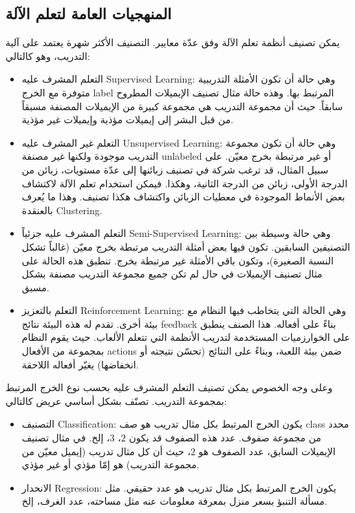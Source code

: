 \subsection{المنهجيات العامة لتعلم الآلة}
\label{sec:ml:classification}
يمكن تصنيف أنظمة تعلم الآلة وفق عدّة معايير. التصنيف الأكثر شهرة يعتمد على آلية التدريب، وهو كالتالي:
\begin{itemize}
	\item
	التعلم المشرف عليه \textenglish{Supervised Learning}:
	وهي حالة أن تكون الأمثلة التدريبية متوفرة مع الخرج \textenglish{label} المرتبط بها. وهذه حالة مثال تصنيف الإيميلات المطروح سابقاً.
	حيث أن مجموعة التدريب هي مجموعة كبيرة من الإيميلات المصنفة مسبقاً من قبل البشر إلى إيميلات مؤذية وإيميلات غير مؤذية.
	\item
	التعلم غير المشرف عليه \textenglish{Unsupervised Learning}:
	وهي حالة أن تكون مجموعة التدريب موجودة ولكنها غير مصنفة \textenglish{unlabeled} أو غير مرتبطة بخرج معيّن.
	على سبيل المثال، قد ترغب شركة في تصنيف زبائنها إلى عدّة مستويات، زبائن من الدرجة الأولى، زبائن من الدرجة الثانية، وهكذا.
	فيمكن استخدام تعلم الآلة لاكتشاف بعض الأنماط الموجودة في معطيات الزبائن واكتشاف هكذا تصنيف.
	وهذا ما يُعرف بالعنقدة \textenglish{Clustering}.
	\item
	التعلم المشرف عليه جزئياً \textenglish{Semi-Supervised Learning}:
	وهي حالة وسيطة بين التصنيفين السابقين. تكون فيها بعض أمثلة التدريب مرتبطة بخرج معيّن (غالباً تشكل النسبة الصغيرة)،
	وتكون باقي الأمثلة غير مرتبطة بخرج. تنطبق هذه الحالة على مثال تصنيف الإيميلات في حال لم تكن جميع مجموعة التدريب مصنفة بشكل مسبق.
	\item 
	التعلم بالتعزيز \textenglish{Reinforcement Learning}:
	وهي الحالة التي يتخاطب فيها النظام مع بيئة أخرى. تقدم له هذه البيئة نتائج \textenglish{feedback} بناءً على أفعاله.
	هذا الصنف ينطبق على الخوارزميات المستخدمة لتدريب الأنظمة التي تتعلم الألعاب.
	حيث يقوم النظام بمجموعة من الأفعال \textenglish{actions} ضمن بيئة اللعبة،
	وبناءً على النتائج (تحسّن نتيجته أو انخفاضها) يغيّر أفعاله اللاحقة.
\end{itemize}

وعلى وجه الخصوص يمكن تصنيف التعلم المشرف عليه بحسب نوع الخرج المرتبط بمجموعة التدريب.
تصنّف بشكل أساسي عريض كالتالي:
\begin{itemize}
	\item 
	التصنيف \textenglish{Classification}:
	يكون الخرج المرتبط بكل مثال تدريب هو صف \textenglish{class} محدد من مجموعة صفوف. عدد هذه الصفوف قد يكون $2$، $3$، إلخ.
	في مثال تصنيف الإيميلات السابق، عدد الصفوف هو $2$، حيث أن كل مثال تدريب (إيميل معيّن من مجموعة التدريب) هو إمّا مؤذي أو غير مؤذي.
	\item 
	الانحدار \textenglish{Regression}:
	يكون الخرج المرتبط بكل مثال تدريب هو عدد حقيقي. مثل مسألة التنبؤ بسعر منزل بمعرفة معلومات عنه مثل مساحته، عدد الغرف، إلخ.
\end{itemize}






